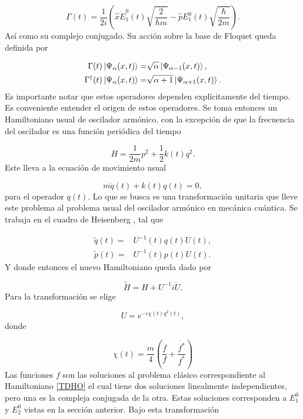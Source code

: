 \documentclass[a4paper,10pt]{report}
\begin{document}
\begin{equation}\label{FloquetOperators}
\Gamma(t) = \frac{1}{2i}(\hat{x}\dot{E}_1^0(t)\sqrt{\frac{2}{\hbar m}}-\hat{p}E_1^0(t)\sqrt{\frac{\hbar}{2m}}).
\end{equation} Así como su complejo conjugado. Su acción sobre la base de Floquet queda definida por

\begin{align*}
\Gamma(t) \Ket{\Psi_\alpha (x,t)} =& \sqrt{\alpha}\Ket{\Psi_{\alpha-1} (x,t)}, \\
\Gamma^\dagger(t) \Ket{\Psi_\alpha (x,t)} =& \sqrt{\alpha+1}\Ket{\Psi_{\alpha+1} (x,t)}.
\end{align*}Es importante notar que estos operadores dependen explícitamente del tiempo. Es conveniente entender el origen de estos operadores. Se toma entonces un Hamiltoniano usual de oscilador armónico, con la excepción de que la frecuencia del oscilador es una función periódica del tiempo

\begin{equation}\label{TDHO}
H = \frac{1}{2m}p^2 + \frac{1}{2}k(t)q^2.
\end{equation} Este lleva a la ecuación de movimiento usual

\begin{equation}
m\ddot{q}(t) + k(t)q(t) = 0,
\end{equation} para el operador $q(t)$. Lo que se busca es una transformación unitaria que lleve este problema al problema usual del oscilador armónico en mecánica cuántica. Se trabaja en el cuadro de Heisenberg \cite{SakuraiQM}, tal que

\begin{align}
\tilde{q}(t) =& U^{-1}(t)q(t)U(t),\\
\tilde{p}(t) =& U^{-1}(t)p(t)U(t).
\end{align} Y donde entonces el nuevo Hamiltoniano queda dado por

\begin{equation}
\tilde{H} = H + U^{-1}i\dot{U}.
\end{equation} Para la transformación se elige

\begin{equation}
U = e^{-i\chi(t)q^2(t)},
\end{equation} donde

\begin{equation}
\chi(t) = \frac{m}{4}(\frac{\dot{f}}{f}+\frac{\dot{f^*}}{f^*})
\end{equation} Las funciones $f$ son las soluciones al problema clásico correspondiente al Hamiltoniano \eqref{TDHO} el cual tiene dos soluciones linealmente independientes, pero una es la compleja conjugada de la otra. Estas soluciones corresponden a $E_1^0$  y $E_2^0$ vistas en la sección anterior. Bajo esta transformación
\end{document}
